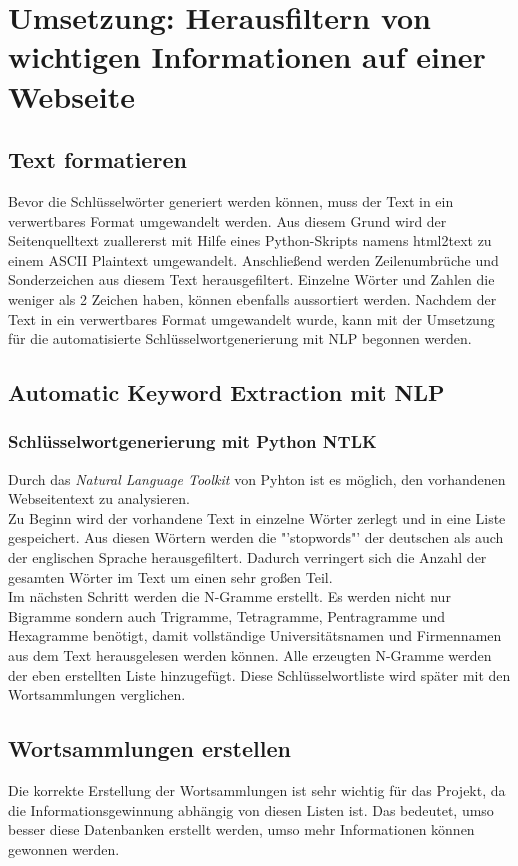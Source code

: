 \section{Umsetzung: Herausfiltern von wichtigen Informationen auf einer Webseite}
	\subsection{Text formatieren}
	Bevor die Schlüsselwörter generiert werden können, muss der Text in ein verwertbares Format umgewandelt werden. Aus diesem Grund wird der Seitenquelltext zuallererst mit Hilfe eines Python-Skripts namens html2text zu einem ASCII Plaintext umgewandelt.\cite{html2text} Anschließend werden Zeilenumbrüche und Sonderzeichen aus diesem Text herausgefiltert. Einzelne Wörter und Zahlen die weniger als 2 Zeichen haben, können ebenfalls aussortiert werden. Nachdem der Text in ein verwertbares Format umgewandelt wurde, kann mit der Umsetzung für die automatisierte Schlüsselwortgenerierung mit NLP begonnen werden.
	\subsection{Automatic Keyword Extraction mit NLP}
	\subsubsection{Schlüsselwortgenerierung mit Python NTLK}
	Durch das \textit{Natural Language Toolkit} von Pyhton ist es möglich, den vorhandenen Webseitentext zu analysieren.\\
	Zu Beginn wird der vorhandene Text in einzelne Wörter zerlegt und in eine Liste gespeichert. Aus diesen Wörtern werden die "'stopwords"' der deutschen als auch der englischen Sprache herausgefiltert. Dadurch verringert sich die Anzahl der gesamten Wörter im Text um einen sehr großen Teil. \\
	Im nächsten Schritt werden die N-Gramme erstellt. Es werden nicht nur Bigramme sondern auch Trigramme, Tetragramme, Pentragramme und Hexagramme benötigt, damit vollständige Universitätsnamen und Firmennamen aus dem Text herausgelesen werden können. Alle erzeugten N-Gramme werden der eben erstellten Liste hinzugefügt. Diese Schlüsselwortliste wird später mit den Wortsammlungen verglichen.\\
	
	\subsection{Wortsammlungen erstellen}
	Die korrekte Erstellung der Wortsammlungen ist sehr wichtig für das Projekt, da die Informationsgewinnung abhängig von diesen Listen ist. Das bedeutet, umso besser diese Datenbanken erstellt werden, umso mehr Informationen können gewonnen werden.
	
